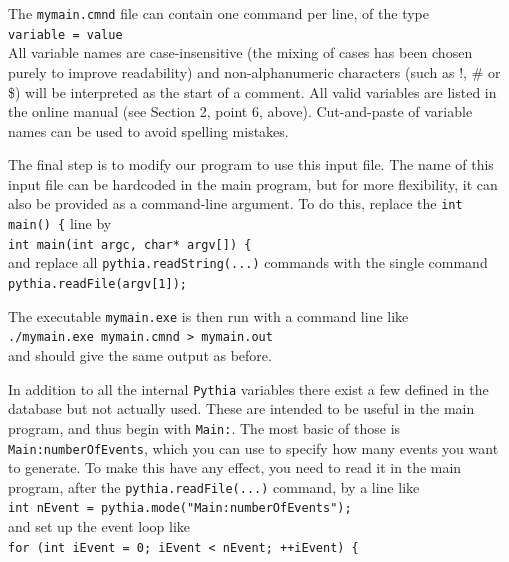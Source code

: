 \documentclass[12pt,a4paper]{article}
\begin{document}
The \texttt{mymain.cmnd} file can contain one command per line,
of the type\\
\hspace*{10mm}\texttt{variable = value}\\
All variable names are case-insensitive (the mixing of cases has been
chosen purely to improve readability) and non-alphanumeric characters
(such as !, \# or \$) will be interpreted as the start of a comment. All
valid variables are listed in the online manual (see Section 2, point 6,
above). Cut-and-paste of variable names can be used to avoid spelling
mistakes.

The final step is to modify our program to use this input file. The name of
this input file can be hardcoded in the main program, but for more
flexibility, it can also be provided as a command-line argument. To do
this, replace the \texttt{int main() \{} line by \\
\hspace*{10mm} \texttt{int main(int argc, char* argv[]) \{}\\
and replace all \texttt{pythia.readString(...)} commands with the single
command\\
\hspace*{10mm}\texttt{pythia.readFile(argv[1]);} 

The executable \texttt{mymain.exe} is then run with a command line like\\
\hspace*{10mm}\texttt{./mymain.exe mymain.cmnd > mymain.out}\\
and should give the same output as before.

In addition to all the internal \texttt{Pythia} variables there exist a
few defined in the database but not actually used. These are intended to 
be useful in the main program, and thus begin with \texttt{Main:}.
The most basic of those is \texttt{Main:numberOfEvents}, which you can 
use to specify how many events you want to generate. To make this have
any effect, you need to read it in the main program, after
the \texttt{pythia.readFile(...)} command, by a line like\\
\hspace*{10mm}\texttt{int nEvent = pythia.mode("Main:numberOfEvents");}\\
and set up the event loop like\\
\hspace*{10mm}\texttt{for (int iEvent = 0; iEvent < nEvent; ++iEvent) \{ }
\end{document}
